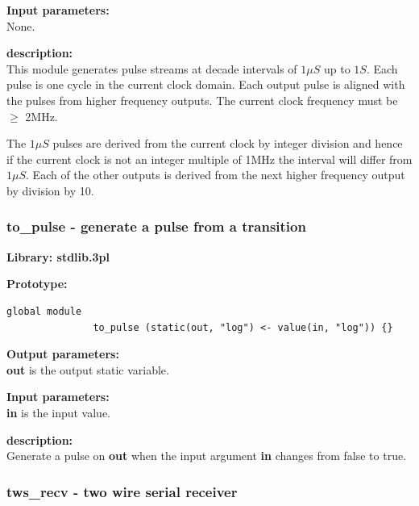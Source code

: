             {\bf Input parameters:} \\
            None.

            {\bf description:} \\
            This module generates pulse streams at decade intervals of $1\mu S$
            up to $1S$. Each pulse is one cycle in the current clock domain.
            Each output pulse is aligned with the pulses from higher frequency
            outputs. The current clock frequency must be $\ge$ 2MHz.
            
            The $1\mu S$ pulses are derived from the current clock by integer
            division and hence if the current clock is not an integer
            multiple of 1MHz the interval will differ from $1\mu S$. Each of
            the other outputs is derived from the next higher frequency
            output by division by 10.


        \subsubsection{to\_pulse - generate a pulse from a
                                                    transition}\label{sec:lmtopulse}

            {\bf Library: stdlib.3pl}

            {\bf Prototype:} \\
            \vsp
            \begin{lstlisting}[gobble=12, language=threepl]
               global module
               to_pulse (static(out, "log") <- value(in, "log")) {}
            \end{lstlisting}

            {\bf Output parameters:} \\
            {\bf out} is the output static variable.

            {\bf Input parameters:} \\
            {\bf in} is the input value.

            {\bf description:} \\
            Generate a pulse on {\bf out} when the input argument {\bf in}
            changes from false to true.



        \subsubsection{tws\_recv - two wire serial receiver}\label{sec:lmtwsrecv}

